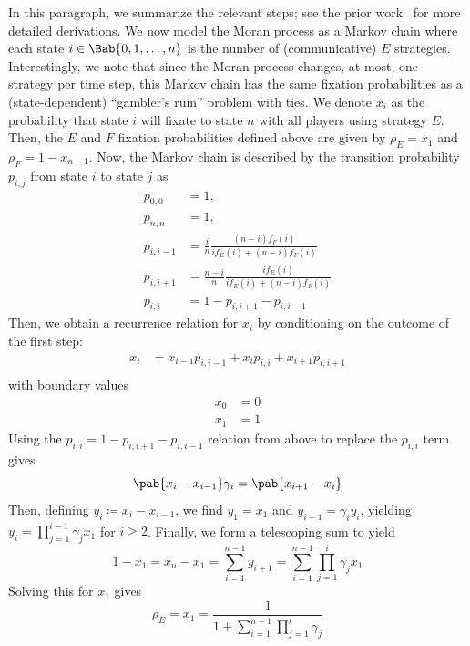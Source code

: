 \documentclass[10pt,letterpaper]{article}
\begin{document}
In this paragraph, we summarize the relevant steps;
see the prior work~\cite{tripp2022evolutionary}
for more detailed derivations.
We now model the Moran process
as a Markov chain where each state $i \in \Bab{0,1,\ldots,n}$
is the number of (communicative) $E$ strategies.
Interestingly, we note that since the Moran process changes, at most,
one strategy per time step,
this Markov chain has the same fixation probabilities
as a (state-dependent) ``gambler's ruin'' problem with ties.
We denote $x_i$ as the probability that state $i$ will fixate
to state $n$ with all players using strategy $E$.
Then, the $E$ and $F$ fixation probabilities defined above are given by
$\rho_E = x_1$ and $\rho_F = 1 - x_{n-1}$.
Now, the Markov chain is described by the transition probability $p_{i,j}$
from state $i$ to state $j$ as
\begin{align*}
  p_{0,0} &= 1, \\
  p_{n,n} &= 1, \\
  p_{i,i-1} &= \frac{i}{n} \frac{(n-i) f_F(i)}{i f_E(i) + (n-i) f_F(i)} \\
  p_{i,i+1} &= \frac{n-i}{n} \frac{i f_E(i)}{i f_E(i) + (n-i) f_F(i)} \\
  p_{i,i} &= 1 - p_{i,i+1} - p_{i,i-1}
\end{align*}
Then, we obtain a recurrence relation for $x_i$ by conditioning
on the outcome of the first step:
\begin{align*}
  x_i &= x_{i-1} p_{i,i-1} + x_i p_{i,i} + x_{i+1} p_{i,i+1} \\
\end{align*}
with boundary values
\begin{align*}
  x_0 &= 0 \\
  x_1 &= 1
\end{align*}
Using the $p_{i,i} = 1 - p_{i,i+1} - p_{i,i-1}$ relation from above
to replace the $p_{i,i}$ term gives
\begin{equation*}
  \pab{x_i - x_{i-1}} \gamma_i = \pab{x_{i+1} - x_i}
\end{equation*}
Then, defining $y_i \coloneqq x_i - x_{i-1}$,
we find $y_1 = x_1$ and $y_{i+1} = \gamma_i y_i$,
yielding $y_i = \prod_{j=1}^{i-1} \gamma_j x_1$ for $i \ge 2$.
Finally, we form a telescoping sum to yield
\begin{equation*}
  1 - x_1 = x_n - x_1
  = \sum_{i=1}^{n-1} y_{i+1}
  = \sum_{i=1}^{n-1} \prod_{j=1}^i \gamma_j x_1
\end{equation*}
Solving this for $x_1$ gives
\begin{equation}
  \rho_E = x_1 = \frac{1}{1 + \sum_{i=1}^{n-1} \prod_{j=1}^i \gamma_j}
  \label{eq:comm_fixation_prob}
\end{equation}
\end{document}
